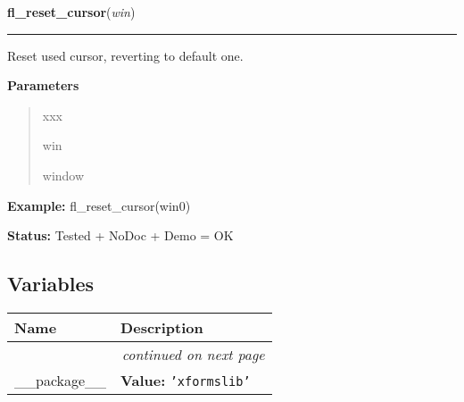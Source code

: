 \hspace{.8\funcindent}\begin{boxedminipage}{\funcwidth}

    \raggedright \textbf{fl\_reset\_cursor}(\textit{win})

    \vspace{-1.5ex}

    \rule{\textwidth}{0.5\fboxrule}
\setlength{\parskip}{2ex}
    Reset used cursor, reverting to default one.

\setlength{\parskip}{1ex}
      \textbf{Parameters}
      \vspace{-1ex}

      \begin{quote}
        \begin{Ventry}{xxx}

          \item[win]

          window

        \end{Ventry}

      \end{quote}

\textbf{Example:} fl\_reset\_cursor(win0)



\textbf{Status:} Tested + NoDoc + Demo = OK



    \end{boxedminipage}



  \subsection{Variables}

    \vspace{-1cm}
\hspace{\varindent}\begin{longtable}{|p{\varnamewidth}|p{\vardescrwidth}|l}
\cline{1-2}
\cline{1-2} \centering \textbf{Name} & \centering \textbf{Description}& \\
\cline{1-2}
\endhead\cline{1-2}\multicolumn{3}{r}{\small\textit{continued on next page}}\\\endfoot\cline{1-2}
\endlastfoot\raggedright \_\-\_\-p\-a\-c\-k\-a\-g\-e\-\_\-\_\- & \raggedright \textbf{Value:} 
{\tt \texttt{'}\texttt{xformslib}\texttt{'}}&\\
\cline{1-2}
\end{longtable}

